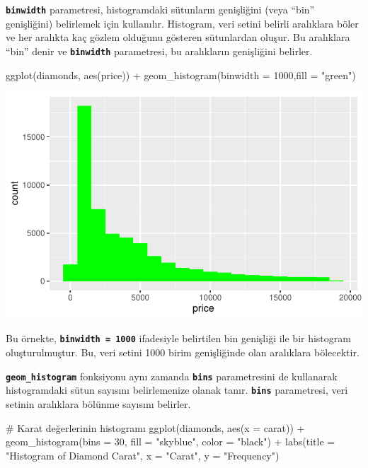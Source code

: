 \documentclass[
  letterpaper,
  DIV=11,
  numbers=noendperiod]{scrreprt}
\newenvironment{Shaded}{\begin{snugshade}}{\end{snugshade}}
\newcommand{\AttributeTok}[1]{\textcolor[rgb]{0.40,0.45,0.13}{#1}}
\newcommand{\CommentTok}[1]{\textcolor[rgb]{0.37,0.37,0.37}{#1}}
\newcommand{\DecValTok}[1]{\textcolor[rgb]{0.68,0.00,0.00}{#1}}
\newcommand{\FunctionTok}[1]{\textcolor[rgb]{0.28,0.35,0.67}{#1}}
\newcommand{\NormalTok}[1]{\textcolor[rgb]{0.00,0.23,0.31}{#1}}
\newcommand{\SpecialCharTok}[1]{\textcolor[rgb]{0.37,0.37,0.37}{#1}}
\newcommand{\StringTok}[1]{\textcolor[rgb]{0.13,0.47,0.30}{#1}}
\begin{document}
\textbf{\texttt{binwidth}} parametresi, histogramdaki sütunların
genişliğini (veya ``bin'' genişliğini) belirlemek için kullanılır.
Histogram, veri setini belirli aralıklara böler ve her aralıkta kaç
gözlem olduğunu gösteren sütunlardan oluşur. Bu aralıklara ``bin'' denir
ve \textbf{\texttt{binwidth}} parametresi, bu aralıkların genişliğini
belirler.

\begin{Shaded}
\begin{Highlighting}[]
\FunctionTok{ggplot}\NormalTok{(diamonds, }\FunctionTok{aes}\NormalTok{(price)) }\SpecialCharTok{+}
  \FunctionTok{geom\_histogram}\NormalTok{(}\AttributeTok{binwidth =} \DecValTok{1000}\NormalTok{,}\AttributeTok{fill =} \StringTok{"green"}\NormalTok{)}
\end{Highlighting}
\end{Shaded}

\includegraphics{ggplot2_files/figure-pdf/unnamed-chunk-2-1.pdf}

Bu örnekte, \textbf{\texttt{binwidth\ =\ 1000}} ifadesiyle belirtilen
bin genişliği ile bir histogram oluşturulmuştur. Bu, veri setini 1000
birim genişliğinde olan aralıklara bölecektir.

\textbf{\texttt{geom\_histogram}} fonksiyonu aynı zamanda
\textbf{\texttt{bins}} parametresini de kullanarak histogramdaki sütun
sayısını belirlemenize olanak tanır. \textbf{\texttt{bins}} parametresi,
veri setinin aralıklara bölünme sayısını belirler.

\begin{Shaded}
\begin{Highlighting}[]
\CommentTok{\# Karat değerlerinin histogramı}
\FunctionTok{ggplot}\NormalTok{(diamonds, }\FunctionTok{aes}\NormalTok{(}\AttributeTok{x =}\NormalTok{ carat)) }\SpecialCharTok{+}
  \FunctionTok{geom\_histogram}\NormalTok{(}\AttributeTok{bins =} \DecValTok{30}\NormalTok{, }\AttributeTok{fill =} \StringTok{"skyblue"}\NormalTok{, }\AttributeTok{color =} \StringTok{"black"}\NormalTok{) }\SpecialCharTok{+}
  \FunctionTok{labs}\NormalTok{(}\AttributeTok{title =} \StringTok{"Histogram of Diamond Carat"}\NormalTok{,}
       \AttributeTok{x =} \StringTok{"Carat"}\NormalTok{,}
       \AttributeTok{y =} \StringTok{"Frequency"}\NormalTok{)}
\end{Highlighting}
\end{Shaded}
\end{document}
